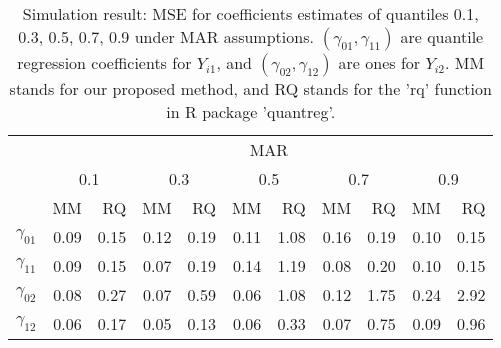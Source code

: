 \documentclass[12pt]{article}
\begin{document}
\begin{table}[ht]
  \renewcommand{\arraystretch}{1.3}
  \centering
  \caption{Simulation result: MSE for coefficients estimates of quantiles
    0.1, 0.3, 0.5, 0.7, 0.9 under MAR assumptions. $(\gamma_{01}, \gamma_{11})$
    are quantile regression coefficients for $Y_{i1}$, and $(\gamma_{02}, \gamma_{12})$
    are ones for $Y_{i2}$. MM stands for our proposed method, and RQ stands for the 'rq'
    function in R package 'quantreg'.}\label{tab:simh2}
  \vspace{10pt}
  \begin{tabular}{rrrrrrrrrrr}
    \toprule
    & \multicolumn{ 10}{c}{MAR} \\
    \cline{2-11}
    &  \multicolumn{2}{c}{0.1} &  \multicolumn{2}{c}{0.3} &  \multicolumn{2}{c}{0.5} &
    \multicolumn{2}{c}{0.7} &  \multicolumn{2}{c}{0.9} \\
    \cline{2-11}
    & MM & RQ    & MM & RQ    & MM & RQ    & MM & RQ    & MM & RQ \\
    \hline
    $\gamma_{01}$ & 0.09 & 0.15 & 0.12 & 0.19 & 0.11 & 1.08 & 0.16 & 0.19 & 0.10 & 0.15 \\
    $\gamma_{11}$ & 0.09 & 0.15 & 0.07 & 0.19 & 0.14 & 1.19 & 0.08 & 0.20 & 0.10 & 0.15 \\
    $\gamma_{02}$ & 0.08 & 0.27 & 0.07 & 0.59 & 0.06 & 1.08 & 0.12 & 1.75 & 0.24 & 2.92 \\
    $\gamma_{12}$ & 0.06 & 0.17 & 0.05 & 0.13 & 0.06 & 0.33 & 0.07 & 0.75 & 0.09 & 0.96 \\
    \bottomrule
  \end{tabular}
\end{table}
\end{document}
